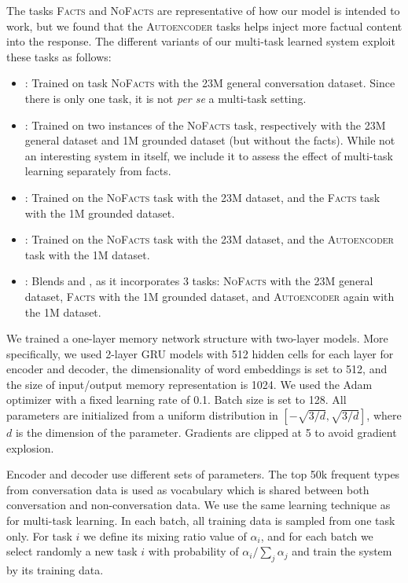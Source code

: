 \documentclass[letterpaper]{article}
\begin{document}
The tasks \textsc{Facts} and \textsc{NoFacts} are representative of how our model is intended to work, but we found that the \textsc{Autoencoder} tasks helps inject more factual content into the response. The different variants of our multi-task learned system exploit these tasks as follows:
\begin{itemize}
   \item \sts{}: Trained on task \textsc{NoFacts} with the 23M general conversation dataset. Since there is only one task, it is not {\it per se} a multi-task setting.
   \item \MTask: Trained on two instances of the \textsc{NoFacts} task, respectively with the 23M general dataset and 1M grounded dataset (but without the facts). While not an interesting system in itself, we include it to assess the effect of multi-task learning separately from facts.
    \item \MTaskR: Trained on the \textsc{NoFacts} task with the 23M dataset, and the \textsc{Facts} task with the 1M grounded dataset.
    \item \MTaskF: Trained on the \textsc{NoFacts} task with the 23M dataset, and the \textsc{Autoencoder} task with the 1M dataset.
    \item \MTaskRF: Blends \MTaskF and \MTaskR, as it incorporates 3 tasks:
    \textsc{NoFacts} with the 23M general dataset, 
    \textsc{Facts} with the 1M grounded dataset, 
    and \textsc{Autoencoder} again with the 1M dataset.
\end{itemize}

We trained a one-layer memory network structure with two-layer \sts models.
More specifically, 
we used 2-layer GRU models with 512 hidden cells for each layer for encoder and decoder,
the dimensionality of word embeddings is set to 512, 
and the size of input/output memory representation is 1024.
We used the Adam optimizer with a fixed learning rate of 0.1.
Batch size is set to 128.
All parameters are initialized from a uniform distribution in $[-\sqrt {3/d}, \sqrt {3/d} ]$, where $d$ is the dimension of the parameter.
Gradients are clipped at 5 to avoid gradient explosion.

Encoder and decoder use different sets of parameters. The top 50k frequent types from conversation data is used as vocabulary which is shared between both conversation and non-conversation data.
We use the same learning technique as \cite{luong2015multi} for multi-task learning. In each batch, all training data is sampled from one task only. For task $i$ we define its mixing ratio value of $\alpha_i$, and for each batch we select randomly a new task $i$ with probability of ${\alpha_i}/{\sum_j \alpha_j}$ and train the system by its training data.
\end{document}

